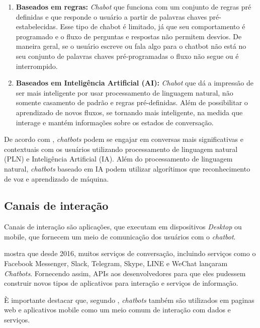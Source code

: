 \begin{enumerate}
    \item \textbf{Baseados em regras:} \textit{Chabot} que funciona com um conjunto de regras pré definidas e que responde o usuário a partir de palavras chaves pré-estabelecidas. Esse tipo de chabot é limitado, já que seu comportamento é programado e o fluxo de perguntas e respostas não permitem desvios. De maneira geral, se o usuário escreve ou fala algo para o chatbot não está no seu conjunto de palavras chaves pré-programadas o fluxo não segue ou é interrompido.
    
    \item \textbf{Baseados em Inteligência Artificial (AI): }\textit{Chabot} que dá a impressão de ser mais inteligente por usar processamento de linguagem natural, não somente casamento de padrão e regras pré-definidas. Além de possibilitar o aprendizado de novos fluxos, se tornando mais inteligente, na medida que interage e mantém informações sobre os estados de conversação.
\end{enumerate}


De acordo com , \textit{chatbots} podem se engajar em conversas mais significativas e contextuais com os usuários utilizando processamento de linguagem natural (PLN) e Inteligência Artificial (IA). Além do processamento de linguagem natural, \textit{chatbots} baseado em IA podem utilizar algorítimos que reconhecimento de voz e aprendizado de máquina.


\subsection{Canais de interação}

Canais de interação são aplicações, que executam em dispositivos \textit{Desktop} ou mobile, que fornecem um meio de comunicação dos usuários com o \textit{chatbot}.

\cite{brandtzaeg2017people} mostra que desde 2016, muitos serviços de conversação, incluindo
serviços como o Facebook Messenger, Slack,
Telegram, Skype, LINE e WeChat lançaram \textit{Chatbots}. Fornecendo assim, APIs aos desenvolvedores para que eles pudessem construir novos tipos de aplicativos para interação e serviços de informação.

È importante destacar que, segundo  , \textit{chatbots} também são utilizados em paginas web e aplicativos mobile como um meio comum de interação com dados e serviços.

